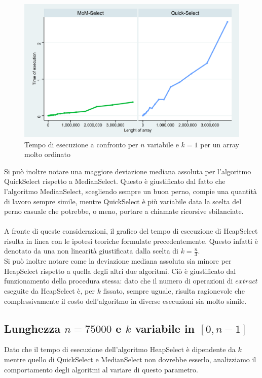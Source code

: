 \documentclass{article}
\begin{document}
	\begin{figure}[h!]		
		\centering
  		\includegraphics[width=\columnwidth]{images/MoM_Quick_graph_ordered_k1.png}
  		\caption{Tempo di esecuzione a confronto per $n$ variabile e $k=1$ per un array molto ordinato}
  		\label{fig:graph2}
	\end{figure}
	
	Si può inoltre notare una maggiore deviazione mediana assoluta per l'algoritmo QuickSelect rispetto a MedianSelect. Questo è giustificato dal fatto che l'algoritmo MedianSelect, scegliendo sempre un buon perno, compie una quantità di lavoro sempre simile, mentre QuickSelect è più variabile data la scelta del perno casuale che potrebbe, o meno, portare a chiamate ricorsive sbilanciate.
	\\\\
	A fronte di queste considerazioni, il grafico del tempo di esecuzione di HeapSelect risulta in linea con le ipotesi teoriche formulate precedentemente. Questo infatti è denotato da una non linearità giustificata dalla scelta di $k=\frac{n}{3}$. 
	\\
	Si può inoltre notare come la deviazione mediana assoluta sia minore per HeapSelect rispetto a quella degli altri due algoritmi. Ciò è giustificato dal funzionamento della procedura stessa: dato che il numero di operazioni di $extract$ eseguite da HeapSelect è, per $k$ fissato, sempre uguale, risulta ragionevole che complessivamente il costo dell'algoritmo in diverse esecuzioni sia molto simile. 
		
	\newpage
	
	\subsection{Lunghezza $n=75000$ e $k$ variabile in $[0,n-1]$}
	Dato che il tempo di esecuzione dell'algoritmo HeapSelect è dipendente da $k$ mentre quello di QuickSelect e MedianSelect non dovrebbe esserlo, analizziamo il comportamento degli algoritmi al variare di questo parametro.
	
\end{document}
